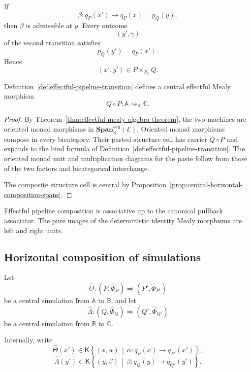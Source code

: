 If
\[
    \beta:q_P(x')\to q_P(x)=p_Q(y),
\]
then \(\beta\) is admissible at \(y\).  Every outcome
\[
    (y',\gamma)
\]
of the second transition satisfies
\[
    p_Q(y')=q_P(x').
\]
Hence
\[
    (x',y')\in P\times_{B_0}Q.
\]

\begin{theorem}
\label{thm:effectful-pipeline-composition}
Definition~\ref{def:effectful-pipeline-transition} defines a central
effectful Mealy morphism
\[
    Q\circ P:
    \mathbb A\rightsquigarrow_{\mathsf K}\mathbb C.
\]
\end{theorem}

\begin{proof}
By Theorem~\ref{thm:effectful-mealy-algebra-theorem}, the two machines are
oriented monad morphisms in
\(\mathbf{Span}^{\mathrm{cen}}_{\mathsf K}(\mathcal E)\).  Oriented monad
morphisms compose in every bicategory.  Their pasted structure cell has
carrier \(Q\circ P\) and expands to the bind formula of
Definition~\ref{def:effectful-pipeline-transition}.  The oriented monad
unit and multiplication diagrams for the paste follow from those of the two
factors and bicategorical interchange.

The composite structure cell is central by
Proposition~\ref{prop:central-horizontal-composition-spans}.
\end{proof}

\begin{corollary}
\label{cor:effectful-pipeline-associativity}
Effectful pipeline composition is associative up to the canonical pullback
associator.  The pure images of the deterministic identity Mealy morphisms
are left and right units.
\end{corollary}

\subsection{Horizontal composition of simulations}
\label{subsec:horizontal-composition-effectful-simulations}

Let
\[
    \widehat\Theta:
    (P,\widehat\Phi_P)
    \Rightarrow
    (P',\widehat\Phi_{P'})
\]
be a central simulation from \(\mathbb A\) to \(\mathbb B\), and let
\[
    \widehat\Lambda:
    (Q,\widehat\Phi_Q)
    \Rightarrow
    (Q',\widehat\Phi_{Q'})
\]
be a central simulation from \(\mathbb B\) to \(\mathbb C\).

Internally, write
\[
    \widehat\Theta(x')
    \in
    \mathsf K
    \left\{
        (x,\alpha)
        \,\middle|\,
        \alpha:q_P(x)\to q_{P'}(x')
    \right\},
\]
\[
    \widehat\Lambda(y')
    \in
    \mathsf K
    \left\{
        (y,\beta)
        \,\middle|\,
        \beta:q_Q(y)\to q_{Q'}(y')
    \right\}.
\]

